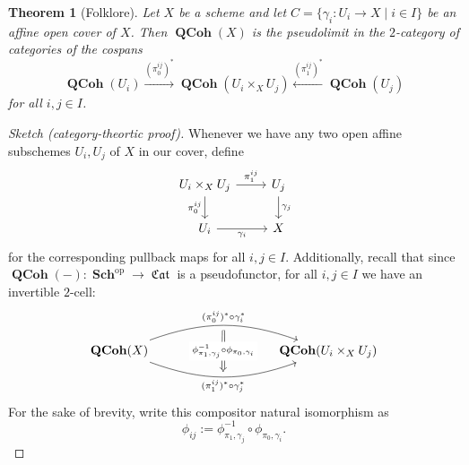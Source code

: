 \documentclass{amsart}
\newtheorem{Theorem}[equation]{Theorem}
\theoremstyle{definition}
\DeclareMathOperator{\fCat}{\mathfrak{Cat}}
\DeclareMathOperator{\op}{op}
\DeclareMathOperator{\Sch}{\mathbf{Sch}}
\DeclareMathOperator{\QCoh}{\mathbf{QCoh}}
\numberwithin{equation}{subsection}
\begin{document}
\begin{Theorem}[Folklore]\label{Thm: Section Background Scheme: QCoh is a pseudolimit}
	Let $X$ be a scheme and let $C = \lbrace \gamma_i:U_i \to X \; | \; i \in I \rbrace$ be an affine open cover of $X$. Then $\QCoh(X)$ is the pseudolimit in the $2$-category of categories of the cospans
	\[
	\QCoh(U_i) \xrightarrow{(\pi_0^{ij})^{\ast}} \QCoh(U_i \times_X U_j) \xleftarrow{(\pi_1^{ij})^{\ast}} \QCoh(U_j)
	\]
	for all $i, j \in I$.
\end{Theorem}
\begin{proof}[Sketch (category-theortic proof)]
	Whenever we have any two open affine subschemes $U_i, U_j$ of $X$ in our cover, define
	\[
	\begin{tikzcd}
		U_i \times_X U_j \ar[r]{}{\pi_1^{ij}} \ar[d, swap]{}{\pi_0^{ij}} & U_j \ar[d]{}{\gamma_j} \\
		U_i \ar[r, swap]{}{\gamma_i} & X
	\end{tikzcd}
	\]
	for the corresponding pullback maps for all $i,j \in I$. Additionally, recall that since $\QCoh(-):\Sch^{\op} \to \fCat$ is a pseudofunctor, for all $i, j \in I$ we have an invertible $2$-cell:
	\[
	\begin{tikzcd}
		\QCoh(X) \ar[rrrr, bend right = 20, swap, ""{name = D}]{}{(\pi_1^{ij})^{\ast} \circ \gamma_j^{\ast}} \ar[rrrr, bend left = 20, ""{name = U}]{}{(\pi_0^{ij})^{\ast} \circ \gamma_i^{\ast}} & & & & \QCoh(U_i \times_X U_j)
		\ar[from = U, to = D, Rightarrow, shorten <= 4pt, shorten >= 4pt]{}[description]{\phi_{\pi_1,\gamma_j}^{-1} \circ \phi_{\pi_0,\gamma_i}}
	\end{tikzcd}
	\]
	For the sake of brevity, write this compositor natural isomorphism as
	\[
	\phi_{ij} :=  \phi_{\pi_1,\gamma_j}^{-1} \circ \phi_{\pi_0,\gamma_i}.
	\]
	

\end{proof}
\end{document}
